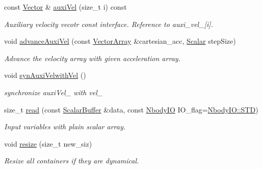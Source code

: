 \begin{DoxyCompactItemize}
const \mbox{\hyperlink{class_space_h_1_1_vel_indep_particles_a61bbcfdb0dc7f99f3c68af69a755c935}{Vector}} \& \mbox{\hyperlink{class_space_h_1_1_vel_dep_chain_particles_a7b5b672b0b887799e3aed436509bd5b5}{auxi\+Vel}} (size\+\_\+t i) const
\begin{DoxyCompactList}\small\item\em Auxiliary velocity vecotr const interface. Reference to auxi\+\_\+vel\+\_\+\mbox{[}i\mbox{]}. \end{DoxyCompactList}\item 
void \mbox{\hyperlink{class_space_h_1_1_vel_dep_chain_particles_ac875237066008b4fa02feeacbbcb100a}{advance\+Auxi\+Vel}} (const \mbox{\hyperlink{class_space_h_1_1_vel_indep_particles_aa9983058940249df8b00fa800e8cbad2}{Vector\+Array}} \&cartesian\+\_\+acc, \mbox{\hyperlink{class_space_h_1_1_vel_indep_particles_aeb47d8131b30ed790320ff634f0d6af1}{Scalar}} step\+Size)
\begin{DoxyCompactList}\small\item\em Advance the velocity array with given acceleration array. \end{DoxyCompactList}\item 
void \mbox{\hyperlink{class_space_h_1_1_vel_dep_chain_particles_a0d32d36439671d1c2344178d1d548567}{syn\+Auxi\+Velwith\+Vel}} ()
\begin{DoxyCompactList}\small\item\em synchronize auxi\+Vel\+\_\+ with vel\+\_\+ \end{DoxyCompactList}\item 
size\+\_\+t \mbox{\hyperlink{class_space_h_1_1_vel_dep_chain_particles_a901445956f76ea38574b2df3c45c77a1}{read}} (const \mbox{\hyperlink{class_space_h_1_1_vel_indep_particles_abca40159a816385790d5a6fd19c1dc6d}{Scalar\+Buffer}} \&data, const \mbox{\hyperlink{namespace_space_h_a296a8bae763a754564bfdce216e31b59}{Nbody\+IO}} I\+O\+\_\+flag=\mbox{\hyperlink{namespace_space_h_a296a8bae763a754564bfdce216e31b59ac6ce23be5d350ce18a665427d2d950f7}{Nbody\+I\+O\+::\+S\+TD}})
\begin{DoxyCompactList}\small\item\em Input variables with plain scalar array. \end{DoxyCompactList}\item 
void \mbox{\hyperlink{class_space_h_1_1_vel_dep_chain_particles_a8cc7751b890724be0bf72471cb65d761}{resize}} (size\+\_\+t new\+\_\+siz)
\begin{DoxyCompactList}\small\item\em Resize all containers if they are dynamical. \end{DoxyCompactList}\item 

\end{DoxyCompactItemize}

